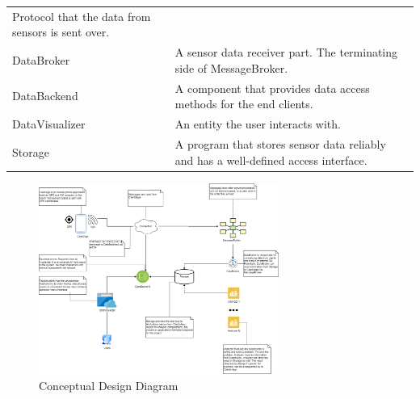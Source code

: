 \begin{longtable}[]{@{}ll@{}}
\begin{minipage}[t]{0.47\columnwidth}
Protocol that the data from sensors is sent over.\strut
\end{minipage}\tabularnewline
\begin{minipage}[t]{0.47\columnwidth}\raggedright
DataBroker\strut
\end{minipage} & \begin{minipage}[t]{0.47\columnwidth}\raggedright
A sensor data receiver part. The terminating side of
MessageBroker.\strut
\end{minipage}\tabularnewline
\begin{minipage}[t]{0.47\columnwidth}\raggedright
DataBackend\strut
\end{minipage} & \begin{minipage}[t]{0.47\columnwidth}\raggedright
A component that provides data access methods for the end clients.\strut
\end{minipage}\tabularnewline
\begin{minipage}[t]{0.47\columnwidth}\raggedright
DataVisualizer\strut
\end{minipage} & \begin{minipage}[t]{0.47\columnwidth}\raggedright
An entity the user interacts with.\strut
\end{minipage}\tabularnewline
\begin{minipage}[t]{0.47\columnwidth}\raggedright
Storage\strut
\end{minipage} & \begin{minipage}[t]{0.47\columnwidth}\raggedright
A program that stores sensor data reliably and has a well-defined access
interface.\strut
\end{minipage}\tabularnewline
\bottomrule
\end{longtable}

\begin{figure}
\centering
\includegraphics[width=0.7\textwidth,height=\textheight]{schemes/conceptual/ConceptualDiagram.png}
\caption{Conceptual Design Diagram}
\end{figure}

